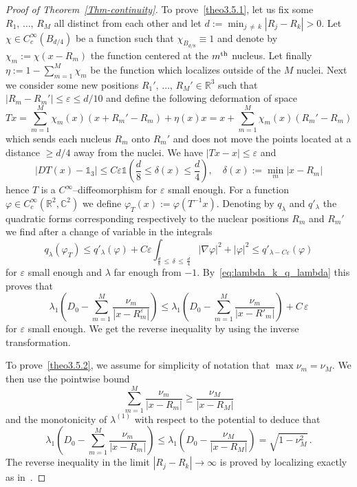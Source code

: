 \documentclass[10pt]{amsart}
\theoremstyle{definition}
\newcommand{\R}{\mathbb{R}}
\newcommand{\C}{\mathbb{C}}
\newcommand\1{{\ensuremath {\mathds 1} }}
\renewcommand\phi{\varphi}
\newcommand{\ii}{\infty}
\renewcommand{\geq}{\geqslant}
\renewcommand{\leq}{\leqslant}
\newcommand{\eps}{\varepsilon}
\begin{document}
\begin{proof}[Proof of Theorem~\ref{Thm-continuity}]
To prove~\eqref{theo3.5.1}, let us fix some $R_1,\,\dots,\,R_M$ all distinct from each other and let $d:=\min_{j\,\neq\,k}|R_j-R_k|>0$. Let $\chi\in C^\ii_c(B_{d/4})$ be a function such that $\chi_{B_{d/8}}\equiv1$ and denote by $\chi_m:=\chi(x-R_m)$ the function centered at the $m^{\rm th}$ nucleus. Let finally $\eta:=1-\sum_{m=1}^M\chi_m$ be the function which localizes outside of the $M$ nuclei. Next we consider some new positions $R_1',\,\dots,\,R_M'\in\R^3$ such that $|R_m-R_m'|\leq \eps\leq d/10$ and define the following deformation of space
\[
Tx=\sum_{m=1}^M\chi_m(x) \left(x+R_m'-R_m\right)+\eta(x) x=x+\sum_{m=1}^M\chi_m(x) \left(R_m'-R_m\right)
\]
which sends each nucleus $R_m$ onto $R_m'$ and does not move the points located at a distance $\geq d/4$ away from the nuclei. We have $|Tx-x|\leq \eps$ and
\[
\left|DT(x)-\1_3\right|\leq C\eps\1\left(\frac{d}8 \leq \delta(x)\leq \frac{d}4\right),\quad \delta(x):=\min_m\left|x-R_m\right|
\]
hence $T$ is a $C^\ii$--diffeomorphism for $\eps$ small enough. For a function $\phi\in C^\ii_c(\R^2,\C^2)$ we define $\phi_T(x):=\phi(T^{-1}x)$. Denoting by $q_\lambda$ and $q'_\lambda$ the quadratic forms corresponding respectively to the nuclear positions $R_m$ and $R_m'$ we find after a change of variable in the integrals
\[
q_\lambda(\phi_T)\leq q'_\lambda(\phi)+C\eps \int_{\frac{d}8 \,\leq\,\delta\,\leq\,\frac{d}4}\left|\nabla \phi\right|^2+|\phi|^2\leq q'_{\lambda-C\eps}(\phi)
\]
for $\eps$ small enough and $\lambda$ far enough from $-1$. By~\eqref{eq:lambda_k_q_lambda} this proves that
\[
\lambda_1\left(D_0-\sum_{m=1}^M\frac{\nu_m}{\left|x-R^\varepsilon_m\right|}\right)\le \lambda_1\left(D_0-\sum_{m=1}^M\frac{\nu_m}{\left|x-R'_m\right|}\right)+C\,\varepsilon
\]
for $\eps$ small enough. We get the reverse inequality by using the inverse transformation.

To prove~\eqref{theo3.5.2}, we assume for simplicity of notation that $\max\nu_m=\nu_M$. We then use the pointwise bound
\[
\sum_{m=1}^M\frac{\nu_m}{\left|x-R_m\right|}\geq \frac{\nu_M}{\left|x-R_M\right|}
\]
and the monotonicity of $\lambda^{(1)}$ with respect to the potential to deduce that
\[
\lambda_1\left(D_0-\sum_{m=1}^M\frac{\nu_m}{\left|x-R_m\right|}\right)\le \lambda_1\left(D_0-\frac{\nu_M}{\left|x-R_M\right|}\right) = \sqrt{1-\nu_M^2}\,.
\]
The reverse inequality in the limit $|R_j-R_k|\to\ii$ is proved by localizing exactly as in~\cite[Corollary~4.7]{BosDolEst-08}.


\end{proof}
\end{document}
